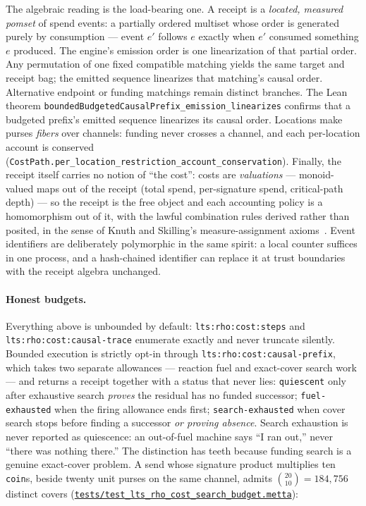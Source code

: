 \documentclass[11pt]{article}
\newcommand{\code}[1]{\texttt{#1}}
\begin{document}
The algebraic reading is the load-bearing one. A receipt is a \emph{located, measured
pomset} of spend events: a partially ordered multiset whose order is generated purely by
consumption --- event $e'$ follows $e$ exactly when $e'$ consumed something $e$ produced.
The engine's emission order is one linearization of that partial order.  Any
permutation of one fixed compatible matching yields the same target and receipt
bag; the emitted sequence linearizes that matching's causal order.  Alternative
endpoint or funding matchings remain distinct branches.  The Lean theorem
\code{boundedBudgetedCausalPrefix\_emission\_linearizes} confirms that a budgeted
prefix's emitted sequence linearizes its causal order. Locations make purses \emph{fibers} over channels: funding
never crosses a channel, and each per-location account is conserved
(\code{CostPath.per\_location\_restriction\_account\_conservation}). Finally, the receipt
itself carries no notion of ``the cost'': costs are \emph{valuations} --- monoid-valued maps
out of the receipt (total spend, per-signature spend, critical-path depth) --- so the
receipt is the free object and each accounting policy is a homomorphism out of it, with the
lawful combination rules derived rather than posited, in the sense of Knuth and Skilling's
measure-assignment axioms~\cite{knuthskilling}. Event identifiers are deliberately
polymorphic in the same spirit: a local counter suffices in one process, and a hash-chained
identifier can replace it at trust boundaries with the receipt algebra unchanged.

\paragraph{Honest budgets.} Everything above is unbounded by default:
\code{lts:rho:cost:steps} and \code{lts:rho:cost:causal-trace} enumerate exactly and never
truncate silently. Bounded execution is strictly opt-in through
\code{lts:rho:cost:causal-prefix}, which takes two separate allowances --- reaction fuel and
exact-cover search work --- and returns a receipt together with a status that never lies:
\code{quiescent} only after exhaustive search \emph{proves} the residual has no funded
successor; \code{fuel-exhausted} when the firing allowance ends first;
\code{search-exhausted} when cover search stops before finding a successor \emph{or proving
absence}. Search exhaustion is never reported as quiescence: an out-of-fuel machine says ``I
ran out,'' never ``there was nothing there.'' The distinction has teeth because funding
search is a genuine exact-cover problem. A send whose signature product multiplies ten
\code{coin}s, beside twenty unit purses on the same channel, admits
$\binom{20}{10}=184{,}756$ distinct covers
(\href{https://github.com/zariuq/CeTTa/blob/e23de3043462d80e27f9c9009bd0f1b955ed140c/tests/test_lts_rho_cost_search_budget.metta}{\code{tests/test\_lts\_rho\_cost\_search\_budget.metta}}):
\end{document}
